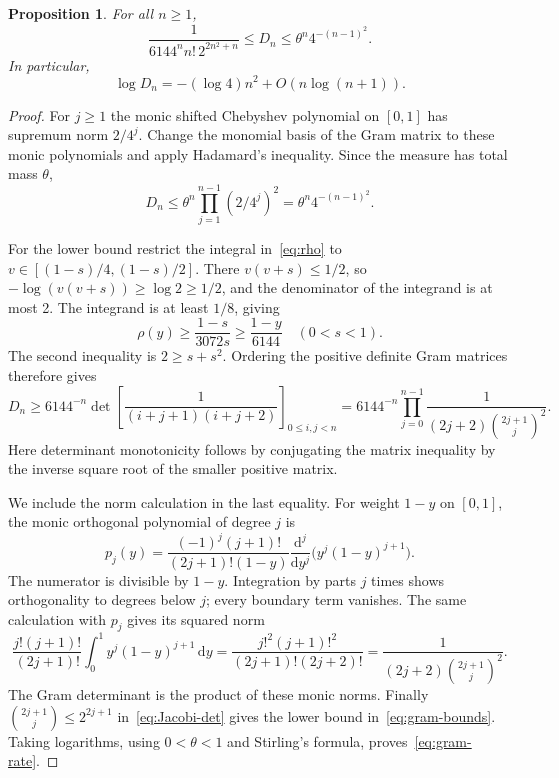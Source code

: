 \documentclass[11pt]{article}
\newtheorem{proposition}[theorem]{Proposition}
\theoremstyle{definition}
\theoremstyle{remark}
\numberwithin{equation}{section}
\newcommand{\dd}{\,\mathrm d}
\begin{document}
\begin{proposition}\label{prop:gram-real}
For all $n\geq1$,
\begin{equation}\label{eq:gram-bounds}
 \frac1{6144^n n!\,2^{2n^2+n}}
 \leq D_n\leq \theta^n4^{-(n-1)^2}.
\end{equation}
In particular,
\begin{equation}\label{eq:gram-rate}
 \log D_n=-(\log4)n^2+O(n\log(n+1)).
\end{equation}
\end{proposition}

\begin{proof}
For $j\geq1$ the monic shifted Chebyshev polynomial on $[0,1]$ has
supremum norm $2/4^j$. Change the monomial basis of the Gram matrix
to these monic polynomials and apply Hadamard's inequality. Since the
measure has total mass $\theta$,
\[
 D_n\leq\theta^n\prod_{j=1}^{n-1}(2/4^j)^2
       =\theta^n4^{-(n-1)^2}.
\]

For the lower bound restrict the integral in~\eqref{eq:rho} to
$v\in[(1-s)/4,(1-s)/2]$. There $v(v+s)\leq1/2$, so
$-\log(v(v+s))\geq\log2\geq1/2$, and the denominator of the
integrand is at most 2. The integrand is at least $1/8$, giving
\begin{equation}\label{eq:rho-lower}
 \rho(y)\geq\frac{1-s}{3072s}\geq\frac{1-y}{6144}
 \quad(0<s<1).
\end{equation}
The second inequality is $2\geq s+s^2$. Ordering the positive definite
Gram matrices therefore gives
\begin{equation}\label{eq:Jacobi-det}
 D_n\geq6144^{-n}
 \det\left[\frac1{(i+j+1)(i+j+2)}\right]_{0\leq i,j<n}
 =6144^{-n}\prod_{j=0}^{n-1}
    \frac1{(2j+2)\binom{2j+1}{j}^2}.
\end{equation}
Here determinant monotonicity follows by conjugating the matrix
inequality by the inverse square root of the smaller positive matrix.

We include the norm calculation in the last equality. For weight $1-y$
on $[0,1]$, the monic orthogonal polynomial of degree $j$ is
\[
 p_j(y)=\frac{(-1)^j(j+1)!}{(2j+1)!(1-y)}
         \frac{\mathrm d^j}{\mathrm dy^j}
             \bigl(y^j(1-y)^{j+1}\bigr).
\]
The numerator is divisible by $1-y$. Integration by parts $j$ times
shows orthogonality to degrees below $j$; every boundary term vanishes.
The same calculation with $p_j$ gives its squared norm
\[
 \frac{j!(j+1)!}{(2j+1)!}
       \int_0^1 y^j(1-y)^{j+1}\dd y
 =\frac{j!^2(j+1)!^2}{(2j+1)!(2j+2)!}
 =\frac1{(2j+2)\binom{2j+1}{j}^2}.
\]
The Gram determinant is the product of these monic norms.
Finally $\binom{2j+1}{j}\leq2^{2j+1}$ in~\eqref{eq:Jacobi-det}
gives the lower bound in~\eqref{eq:gram-bounds}. Taking logarithms,
using $0<\theta<1$ and Stirling's formula, proves~\eqref{eq:gram-rate}.
\end{proof}
\end{document}
